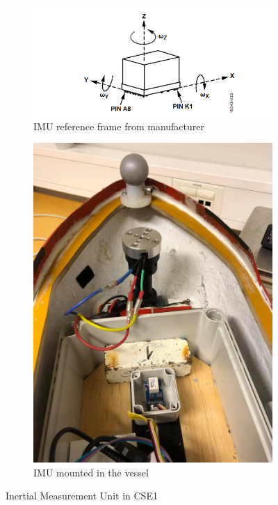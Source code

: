 \begin{figure}[htb!]
	\centering
	\begin{subfigure}{0.45\linewidth}
		\centering
		\includegraphics[width=1\linewidth]{fig/IMU_reference_frame.png}
		\caption{IMU reference frame from manufacturer}
		\label{fig:IMU_reference_frame}
	\end{subfigure}
	\begin{subfigure}{0.45\linewidth}
		\centering
		\includegraphics[width=0.9\linewidth]{fig/IMU_mounted.jpg}
		\caption{IMU mounted in the vessel}
		\label{fig:IMU_mounted}
	\end{subfigure}
\caption{Inertial Measurement Unit in CSE1}
\end{figure}

